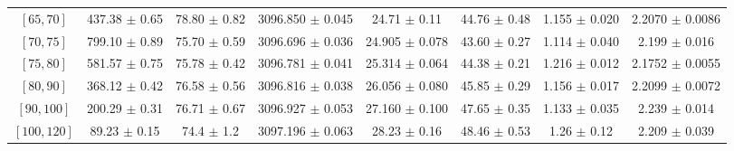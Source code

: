 \begin{tabular}{c||c|c|c|c|c|c|c}
$[65, 70]$ & 437.38 $\pm$ 0.65 & 78.80 $\pm$ 0.82 & 3096.850 $\pm$ 0.045 & 24.71 $\pm$ 0.11 & 44.76 $\pm$ 0.48 & 1.155 $\pm$ 0.020 & 2.2070 $\pm$ 0.0086\\
$[70, 75]$ & 799.10 $\pm$ 0.89 & 75.70 $\pm$ 0.59 & 3096.696 $\pm$ 0.036 & 24.905 $\pm$ 0.078 & 43.60 $\pm$ 0.27 & 1.114 $\pm$ 0.040 & 2.199 $\pm$ 0.016\\
$[75, 80]$ & 581.57 $\pm$ 0.75 & 75.78 $\pm$ 0.42 & 3096.781 $\pm$ 0.041 & 25.314 $\pm$ 0.064 & 44.38 $\pm$ 0.21 & 1.216 $\pm$ 0.012 & 2.1752 $\pm$ 0.0055\\
$[80, 90]$ & 368.12 $\pm$ 0.42 & 76.58 $\pm$ 0.56 & 3096.816 $\pm$ 0.038 & 26.056 $\pm$ 0.080 & 45.85 $\pm$ 0.29 & 1.156 $\pm$ 0.017 & 2.2099 $\pm$ 0.0072\\
$[90, 100]$ & 200.29 $\pm$ 0.31 & 76.71 $\pm$ 0.67 & 3096.927 $\pm$ 0.053 & 27.160 $\pm$ 0.100 & 47.65 $\pm$ 0.35 & 1.133 $\pm$ 0.035 & 2.239 $\pm$ 0.014\\
$[100, 120]$ & 89.23 $\pm$ 0.15 & 74.4 $\pm$ 1.2 & 3097.196 $\pm$ 0.063 & 28.23 $\pm$ 0.16 & 48.46 $\pm$ 0.53 & 1.26 $\pm$ 0.12 & 2.209 $\pm$ 0.039\\
\end{tabular}

